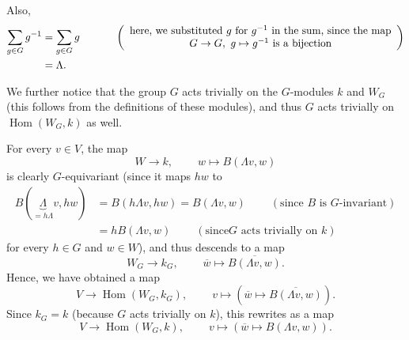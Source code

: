 \documentclass
[numbers=enddot,12pt,final,onecolumn,german,notitlepage]{scrartcl}%
\theoremstyle{definition}
\begin{document}
Also,%
\begin{align*}
\sum\limits_{g\in G}g^{-1}  &  =\sum\limits_{g\in G}%
g\ \ \ \ \ \ \ \ \ \ \left(
\begin{array}
[c]{c}%
\text{here, we substituted }g\text{ for }g^{-1}\text{ in the sum, since the
map}\\
G\rightarrow G,\ g\mapsto g^{-1}\text{ is a bijection}%
\end{array}
\right) \\
&  =\Lambda.
\end{align*}


We further notice that the group $G$ acts trivially on the $G$-modules $k$ and
$W_{G}$ (this follows from the definitions of these modules), and thus $G$
acts trivially on $\operatorname*{Hom}\left(  W_{G},k\right)  $ as well.

For every $v\in V$, the map%
\[
W\rightarrow k,\ \ \ \ \ \ \ \ \ \ w\mapsto B\left(  \Lambda v,w\right)
\]
is clearly $G$-equivariant (since it maps $hw$ to%
\begin{align*}
B\left(  \underbrace{\Lambda}_{=h\Lambda}v,hw\right)   &  =B\left(  h\Lambda
v,hw\right)  =B\left(  \Lambda v,w\right)  \ \ \ \ \ \ \ \ \ \ \left(
\text{since }B\text{ is }G\text{-invariant}\right) \\
&  =hB\left(  \Lambda v,w\right)  \ \ \ \ \ \ \ \ \ \ \left(  \text{since
}G\text{ acts trivially on }k\right)
\end{align*}
for every $h\in G$ and $w\in W$), and thus descends to a map%
\[
W_{G}\rightarrow k_{G},\ \ \ \ \ \ \ \ \ \ \overline{w}\mapsto\overline
{B\left(  \Lambda v,w\right)  }.
\]
Hence, we have obtained a map%
\[
V\rightarrow\operatorname*{Hom}\left(  W_{G},k_{G}\right)
,\ \ \ \ \ \ \ \ \ \ v\mapsto\left(  \overline{w}\mapsto\overline{B\left(
\Lambda v,w\right)  }\right)  .
\]
Since $k_{G}=k$ (because $G$ acts trivially on $k$), this rewrites as a map%
\[
V\rightarrow\operatorname*{Hom}\left(  W_{G},k\right)
,\ \ \ \ \ \ \ \ \ \ v\mapsto\left(  \overline{w}\mapsto B\left(  \Lambda
v,w\right)  \right)  .
\]
\end{document}
